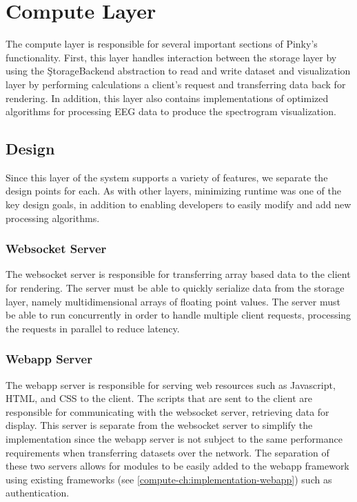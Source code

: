 \chapter{Compute Layer}\label{compute-ch}

The compute layer is responsible for several important sections of Pinky's
functionality. First, this layer handles interaction between the storage layer
by using the \c{StorageBackend} abstraction to read and write dataset and
visualization layer by performing calculations a client's request and
transferring data back for rendering. In addition, this layer also contains
implementations of optimized algorithms for processing EEG data to produce the
spectrogram visualization.

\section{Design}

Since this layer of the system supports a variety of features, we separate the
design points for each. As with other layers, minimizing runtime was one of the
key design goals, in addition to enabling developers to easily modify and add
new processing algorithms.

\subsection{Websocket Server}

The websocket server is responsible for transferring array based data to the
client for rendering. The server must be able to quickly serialize data from
the storage layer, namely multidimensional arrays of floating point values. The
server must be able to run concurrently in order to handle multiple client
requests, processing the requests in parallel to reduce latency.

\subsection{Webapp Server}

The webapp server is responsible for serving web resources such as Javascript,
HTML, and CSS to the client. The scripts that are sent to the client are
responsible for communicating with the websocket server, retrieving data for
display. This server is separate from the websocket server to simplify the
implementation since the webapp server is not subject to the same performance
requirements when transferring datasets over the network. The separation of
these two servers allows for modules to be easily added to the webapp framework
using existing frameworks (see \ref{compute-ch:implementation-webapp}) such as
authentication.

